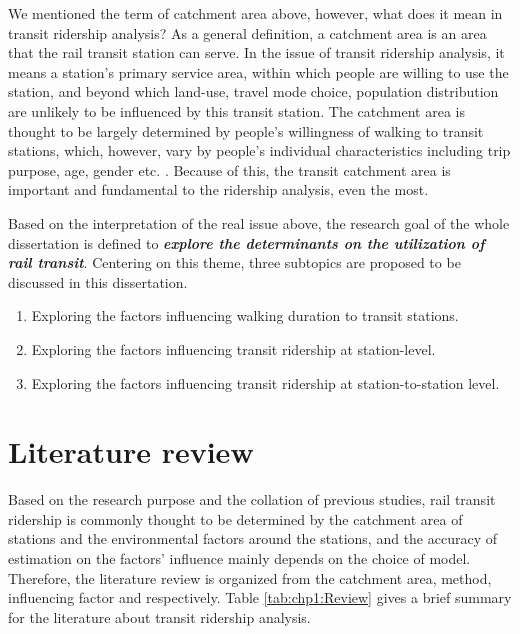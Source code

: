 We mentioned the term of catchment area above, however, what does it mean in transit ridership analysis? As a general definition, a catchment area is an area that the rail transit station can serve. In the issue of transit ridership analysis, it means a station's primary service area, within which people are willing to use the station, and beyond which land-use, travel mode choice, population distribution are unlikely to be influenced by this transit station. The catchment area is thought to be largely determined by people's willingness of walking to transit stations, which, however, vary by people's individual characteristics including trip purpose, age, gender etc. \cite{guerra2013half}. Because of this, the transit catchment area is important and fundamental to the ridership analysis, even the most.

Based on the interpretation of the real issue above, the research goal of the whole dissertation is defined to \emph{\textbf{explore the determinants on the utilization of rail transit}}. Centering on this theme, three subtopics are proposed to be discussed in this dissertation.

\begin{enumerate}
	\setlength{\parskip}{0\baselineskip} %
	\item Exploring the factors influencing walking duration to transit stations.
	\item Exploring the factors influencing transit ridership at station-level.
	\item Exploring the factors influencing transit ridership at station-to-station level.
	\setlength{\parskip}{0.7\baselineskip} %
\end{enumerate}

%
\section{Literature review} 
Based on the research purpose and the collation of previous studies, rail transit ridership is commonly thought to be determined by the catchment area of stations and the environmental factors around the stations, and the accuracy of estimation on the factors' influence mainly depends on the choice of model. Therefore, the literature review is organized from the catchment area, method, influencing factor and respectively. Table \ref{tab:chp1:Review} gives a brief summary for the literature about transit ridership analysis.

